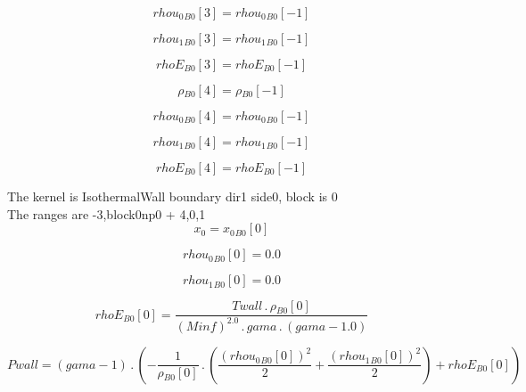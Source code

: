 \documentclass{article}
\begin{document}
\begin{dmath}{rhou_{0}{_{B0}}}[{3}] = {rhou_{0}{_{B0}}}[{-1}]\end{dmath}

\begin{dmath}{rhou_{1}{_{B0}}}[{3}] = {rhou_{1}{_{B0}}}[{-1}]\end{dmath}

\begin{dmath}{rhoE{_{B0}}}[{3}] = {rhoE{_{B0}}}[{-1}]\end{dmath}

\begin{dmath}{\rho{_{B0}}}[{4}] = {\rho{_{B0}}}[{-1}]\end{dmath}

\begin{dmath}{rhou_{0}{_{B0}}}[{4}] = {rhou_{0}{_{B0}}}[{-1}]\end{dmath}

\begin{dmath}{rhou_{1}{_{B0}}}[{4}] = {rhou_{1}{_{B0}}}[{-1}]\end{dmath}

\begin{dmath}{rhoE{_{B0}}}[{4}] = {rhoE{_{B0}}}[{-1}]\end{dmath}

\noindent The kernel is IsothermalWall boundary dir1 side0, block is 0\\\noindent The ranges are -3,block0np0 + 4,0,1\\\begin{dmath}x_{0} = {x_{0}{_{B0}}}[{0}]\end{dmath}

\begin{dmath}{rhou_{0}{_{B0}}}[{0}] = 0.0\end{dmath}

\begin{dmath}{rhou_{1}{_{B0}}}[{0}] = 0.0\end{dmath}

\begin{dmath}{rhoE{_{B0}}}[{0}] = \frac{Twall \,.\, {\rho{_{B0}}}[{0}]}{\left(Minf \right)^{2.0} \,.\, gama \,.\, \left(gama - 1.0\right)}\end{dmath}

\begin{dmath}Pwall = \left(gama - 1\right) \,.\, \left(- \frac{1}{{\rho{_{B0}}}[{0}]} \,.\, \left(\frac{\left({rhou_{0}{_{B0}}}[{0}] \right)^{2}}{2} + \frac{\left({rhou_{1}{_{B0}}}[{0}] \right)^{2}}{2}\right) + {rhoE{_{B0}}}[{0}]\right)\end{dmath}
\end{document}
